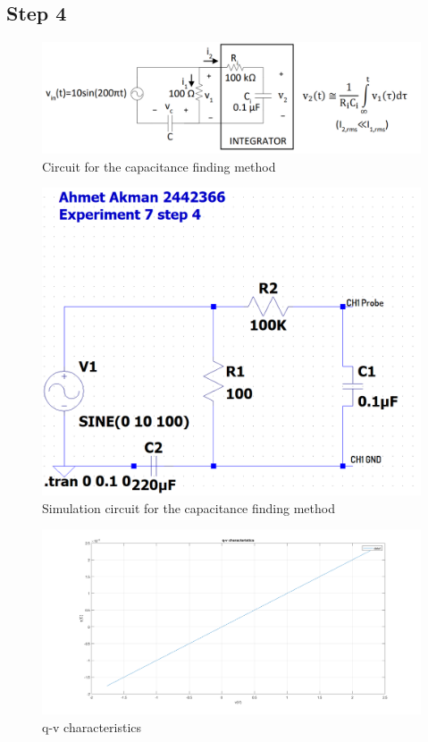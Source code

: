 \documentclass[letterpaper,12pt]{article}
\begin{document}
\subsection{Step 4}
\begin{figure}[H]
	\centering
   \includegraphics[width=1\textwidth]{PRE4.png}
   \caption{Circuit for the capacitance finding method}
\end{figure}
\begin{figure}[H]
	\centering
   \includegraphics[width=1\textwidth]{4_SCH.png}
   \caption{Simulation circuit for the capacitance finding method}
\end{figure}
\begin{figure}[H]
	\centering
   \includegraphics[width=1\textwidth]{4a_plot.png}
   \caption{q-v characteristics}
\end{figure}
\end{document}
